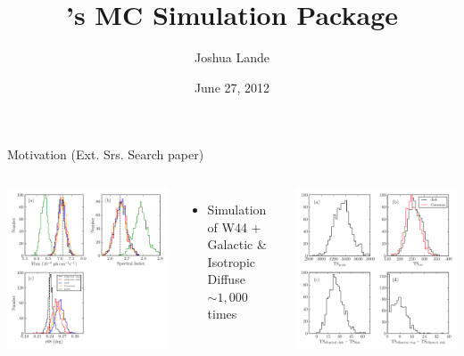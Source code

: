 \documentclass[12pt]{beamer}
\title{\pointlike's MC Simulation Package}
\author{Joshua Lande}
\date{June 27, 2012}
\begin{document}
\fermititle

\begin{frame}{Motivation (Ext. Srs. Search paper)}
\begin{columns}
  \includegraphics[scale=0.35]{plots/bias_w44sim_color.pdf}

  \begin{itemize}
    \item Simulation of W44 + Galactic \& Isotropic Diffuse $\sim 1,000$ times
  \end{itemize}

  \includegraphics[scale=0.35]{plots/ts_comparison_w44sim_color.pdf}


\end{columns}
\end{frame}
\end{document}
